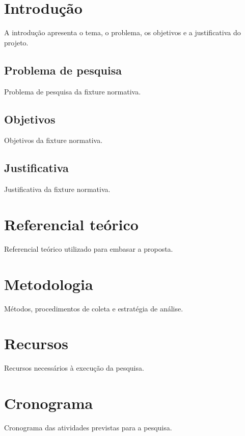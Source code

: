 \documentclass{abntexto-ufc}
\begin{document}
\pretextual

\ufcPrintCover
\ufcPrintTitlePage
\ufcPrintTableOfContents

\textual
\section{Introdução}
A introdução apresenta o tema, o problema, os objetivos e a justificativa do projeto.

\subsection{Problema de pesquisa}
Problema de pesquisa da fixture normativa.

\subsection{Objetivos}
Objetivos da fixture normativa.

\subsection{Justificativa}
Justificativa da fixture normativa.

\section{Referencial teórico}
Referencial teórico utilizado para embasar a proposta.

\section{Metodologia}
Métodos, procedimentos de coleta e estratégia de análise.

\section{Recursos}
Recursos necessários à execução da pesquisa.

\section{Cronograma}
Cronograma das atividades previstas para a pesquisa.

\nocite{silva2020}
\ufcPrintReferences
\end{document}

